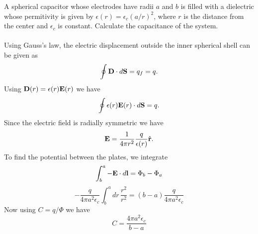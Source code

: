 \documentclass[11pt,letterpaper]{article}
\begin{document}
	\item 
	A spherical capacitor whose electrodes have radii $a$ and $b$ is filled with a dielectric whose permitivity is given by 
	$\epsilon(r) = \epsilon_c(a/r)^2$, where $r$ is the distance from the center and $\epsilon_c$ is constant. Calculate
	the capacitance of the system. 
	\\
	\\
	Using Gauss's law, the electric displacement outside the inner spherical shell can be given as 
	\[
		\oint \mathbf{D}\cdot d\mathbf{S} = q_f = q.
	\]
	Using $\mathbf{D}(r) = \epsilon(r)\mathbf{E}(r)$ we have
	\[
		\oint \mathbf{\epsilon}(r)\mathbf{E}(r)\cdot d\mathbf{S} = q.
	\]	
	Since the electric field is radially symmetric we have
	\[
		 \mathbf{E} = \frac{1}{4\pi r^2}\frac{q}{\epsilon(r)}\hat{\mathbf{r}}.
	\]
	To find the potential between the plates, we integrate 
	\[
		\int_b^a -\mathbf{E}\cdot d\mathbf{l}  = \Phi_b-\Phi_a
	\]
	\[
		-\frac{q}{4\pi a^2\epsilon_c} \int_b^a dr\, \frac{r^2}{r^2} = (b-a)\frac{q}{4\pi a^2\epsilon_c}
	\]
	Now using $C = q/\Phi$ we have
	\[
		C = \frac{4\pi a^2\epsilon_c}{b-a}
	\]
	\\
	\\
	
\end{document}
